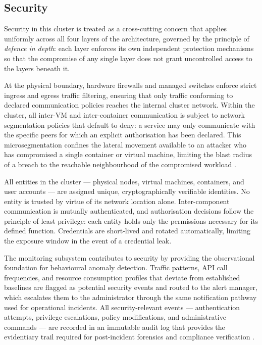 \documentclass[a4paper, 12pt]{report}
\begin{document}
\subsection{Security}
 
Security in this cluster is treated as a cross-cutting concern that
applies uniformly across all four layers of the architecture, governed
by the principle of \textit{defence in depth}: each layer enforces its
own independent protection mechanisms so that the compromise of any
single layer does not grant uncontrolled access to the layers beneath it.
 
At the physical boundary, hardware firewalls and managed switches
enforce strict ingress and egress traffic filtering, ensuring that only
traffic conforming to declared communication policies reaches the
internal cluster network.  Within the cluster, all inter-VM and
inter-container communication is subject to network segmentation policies
that default to deny: a service may only communicate with the specific
peers for which an explicit authorisation has been declared.  This
microsegmentation confines the lateral movement available to an attacker
who has compromised a single container or virtual machine, limiting the
blast radius of a breach to the reachable neighbourhood of the
compromised workload \cite{rose2020zero}.
 
All entities in the cluster --- physical nodes, virtual machines,
containers, and user accounts --- are assigned unique, cryptographically
verifiable identities.  No entity is trusted by virtue of its network
location alone.  Inter-component communication is mutually authenticated,
and authorisation decisions follow the principle of least privilege:
each entity holds only the permissions necessary for its defined function.
Credentials are short-lived and rotated automatically, limiting the
exposure window in the event of a credential leak.
 
The monitoring subsystem contributes to security by providing the
observational foundation for behavioural anomaly detection.  Traffic
patterns, API call frequencies, and resource consumption profiles that
deviate from established baselines are flagged as potential security
events and routed to the alert manager, which escalates them to the
administrator through the same notification pathway used for operational
incidents.  All security-relevant events --- authentication attempts,
privilege escalations, policy modifications, and administrative commands
--- are recorded in an immutable audit log that provides the evidentiary
trail required for post-incident forensics and compliance verification
\cite{beyer2016sre, rose2020zero}.
 
\end{document}
